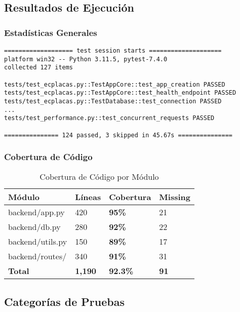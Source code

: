 \documentclass[12pt,a4paper]{article}
\begin{document}
\subsection{Resultados de Ejecución}

\subsubsection{Estadísticas Generales}

\begin{verbatim}
=================== test session starts ====================
platform win32 -- Python 3.11.5, pytest-7.4.0
collected 127 items

tests/test_ecplacas.py::TestAppCore::test_app_creation PASSED
tests/test_ecplacas.py::TestAppCore::test_health_endpoint PASSED
tests/test_ecplacas.py::TestDatabase::test_connection PASSED
...
tests/test_performance.py::test_concurrent_requests PASSED

=============== 124 passed, 3 skipped in 45.67s ===============
\end{verbatim}

\subsubsection{Cobertura de Código}

\begin{table}[h]
\centering
\begin{tabularx}{\textwidth}{|X|X|X|X|}
\hline
\textbf{Módulo} & \textbf{Líneas} & \textbf{Cobertura} & \textbf{Missing} \\
\hline
backend/app.py & 420 & \textcolor{epngreen}{\textbf{95\%}} & 21 \\
\hline
backend/db.py & 280 & \textcolor{epngreen}{\textbf{92\%}} & 22 \\
\hline
backend/utils.py & 150 & \textcolor{epngreen}{\textbf{89\%}} & 17 \\
\hline
backend/routes/ & 340 & \textcolor{epngreen}{\textbf{91\%}} & 31 \\
\hline
\textbf{Total} & \textbf{1,190} & \textcolor{epngreen}{\textbf{92.3\%}} & \textbf{91} \\
\hline
\end{tabularx}
\caption{Cobertura de Código por Módulo}
\end{table}

\subsection{Categorías de Pruebas}
\end{document}
